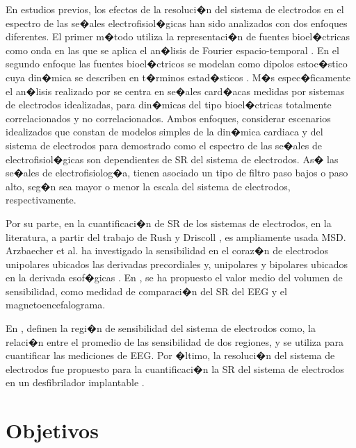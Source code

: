 En estudios previos, los efectos  de la resoluci�n del sistema de electrodos en
el espectro de las se�ales electrofisiol�gicas han sido analizados con dos
enfoques diferentes. El primer m�todo utiliza la representaci�n de fuentes
bioel�ctricas como onda en las que se aplica el an�lisis de Fourier
espacio-temporal \cite{Nunez95, NunezSrinivasan06b}.
En el segundo enfoque las fuentes bioel�ctricos se modelan como dipolos
estoc�stico cuya din�mica se describen en t�rminos estad�sticos \cite{Requena08}. 
M�s espec�ficamente el an�lisis realizado por \cite{Requena08} se
centra en se�ales card�acas medidas por sistemas de electrodos idealizadas, para
din�micas del tipo bioel�ctricas totalmente correlacionados y no correlacionados.
Ambos enfoques, considerar escenarios idealizados que constan de
modelos simples de la din�mica cardiaca y del sistema de electrodos para 
demostrado como el espectro de las se�ales de electrofisiol�gicas son
dependientes de \ac{SR} del sistema de electrodos. As� las se�ales
de electrofisiolog�a, tienen asociado un tipo de filtro paso bajos o paso alto, 
seg�n sea mayor o menor la escala del sistema de electrodos, respectivamente.


Por su parte, en la cuantificaci�n de \ac{SR} de los
sistemas de electrodos, en la literatura, a partir del trabajo de Rush y
Driscoll \cite{Rush69}, es ampliamente usada \ac{MSD}. 
Arzbaecher et al. ha investigado la sensibilidad en el coraz�n
de electrodos unipolares ubicados las derivadas precordiales y, unipolares y
bipolares ubicados en la derivada esof�gicas \cite{Arzbaecher79}. En
\cite{Malmivuo97}, se ha propuesto el valor medio del volumen de  sensibilidad,
como medidad de comparaci�n del \ac{SR} del \ac{EEG} y el magnetoencefalograma. 

En \cite{Vaisanen08}, definen la regi�n de sensibilidad del sistema de
electrodos  como, la relaci�n entre el promedio de las sensibilidad de dos
regiones, y se utiliza para cuantificar las mediciones de \ac{EEG}.  Por
�ltimo, la resoluci�n del sistema de electrodos fue propuesto para la
cuantificaci�n la SR del sistema de electrodos en un desfibrilador implantable
\cite{Requena09}.


\section{Objetivos}

